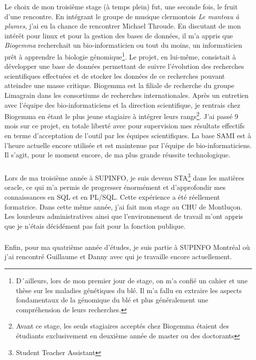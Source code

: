 \documentclass[11pt, a4paper ]{article}
\begin{document}
\begin{spacing}{1.5}
Le choix de mon troisième stage (à temps plein) fut, une seconde fois, le fruit d'une rencontre. En intégrant le groupe de musique clermontois \emph{Le manteau à plumes}, j'ai eu la chance de rencontrer Michael Throude. En discutant de mon intérêt pour linux et pour la gestion des bases de données, il m'a appris que \emph{Biogemma} recherchait un bio-informaticien ou tout du moins, un informaticien prêt à apprendre la biologie génomique\footnote{D´ailleurs, lors de mon premier jour de stage, on m'a confié un cahier et une thèse sur les maladies génétiques du blé. Il m'a fallu en extraire les aspects fondamentaux de la génomique du blé et plus généralement une compréhension de leurs recherches.}. Le projet, en lui-même, consistait à développer une base de données permettant de suivre l'évolution des recherches scientifiques effectuées et de stocker les données de ce recherches pouvant atteindre une masse critique. Biogemma est la filiale de recherche du groupe Limagrain dans les consortiums de recherches internationales. Après un entretien avec l'équipe des bio-informaticiens et la direction scientifique, je rentrais chez Biogemma en étant le plus jeune stagiaire à intégrer leurs rangs\footnote{Avant ce stage, les seuls stagiaires acceptés chez Biogemma étaient des étudiants exclusivement en deuxième année de master ou des doctorants}. J'ai passé 9 mois sur ce projet, en totale liberté avec pour supervision mes résultats effectifs en terme d'acceptation de l’outil par les équipes scientifiques. La base SAMI est à l'heure actuelle encore utilisée et est maintenue par l'équipe de bio-informaticiens. Il s'agit, pour le moment encore, de ma plus grande réussite technologique. 
\subparagraph{} 
Lors de ma troisième année à SUPINFO, je suis devenu STA\footnote{Student Teacher Assistant} dans les matières oracle, ce qui m'a permis de progresser énormément et d’approfondir mes connaissances en SQL et en PL/SQL. Cette expérience a été réellement formatrice. 
Dans cette même année, j'ai fait mon stage au CHU de Montluçon. Les lourdeurs administratives ainsi que l'environnement de travail m'ont appris que je n'étais décidément pas fait pour la fonction publique.
\subparagraph{}
Enfin, pour ma quatrième année d'études, je suis partie à SUPINFO Montréal où j'ai rencontré Guillaume et Danny avec qui je travaille encore actuellement. 



\end{spacing}
\end{document}
